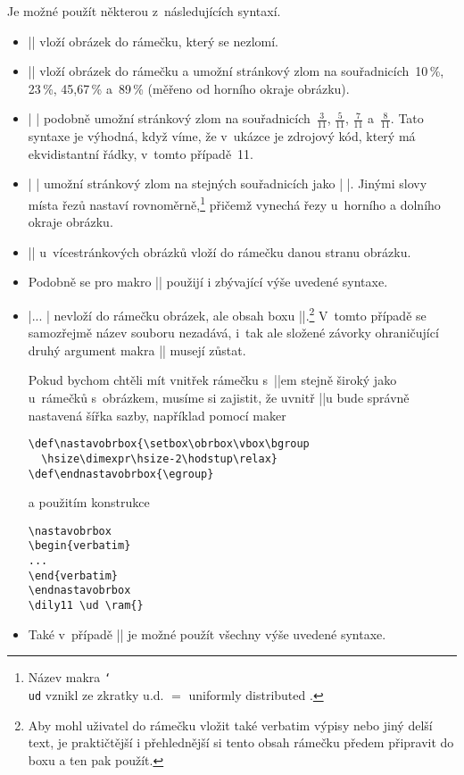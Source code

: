 \documentclass{csbulletin}
\def\p#1{\texttt{\char`\\#1}}
\def\uv#1{\char18 #1\char16 }
\begin{document}
Je možné použít některou z~následujících syntaxí.
\begin{itemize}
\item || vloží obrázek do rámečku, který se nezlomí.
\item || vloží obrázek do rámečku a umožní stránkový zlom na souřadnicích~10\,\%, 23\,\%, 45,67\,\% a~89\,\% (měřeno od horního okraje obrázku).
\item | | podobně umožní stránkový zlom na souřadnicích~$\frac{3}{11}$, $\frac{5}{11}$, $\frac{7}{11}$ a~$\frac{8}{11}$. Tato syntaxe je výhodná, když víme, že v~ukázce je zdrojový kód, který má ekvidistantní řádky, v~tomto případě~11.
\item | \ud {}| umožní stránkový zlom na stejných souřadnicích jako | |. Jinými slovy místa řezů nastaví rovnoměrně,\footnote{Název makra \p{ud} vznikl ze zkratky \uv{u.d.}${}={}$\uv{uniformly distributed}.} přičemž vynechá řezy u~horního a dolního okraje obrázku.
\item || u~vícestránkových obrázků vloží do rámečku danou stranu obrázku.
\item Podobně se pro makro |\Ram| použijí i zbývající výše uvedené syntaxe.
\item |\setbox\obrbox\vbox{...} | nevloží do rámečku obrázek, ale obsah boxu |\obrbox|.\footnote{Aby mohl uživatel do rámečku vložit také verbatim výpisy nebo jiný delší text, je praktičtější i přehlednější si tento obsah rámečku předem připravit do boxu a ten pak použít.} V~tomto případě se samozřejmě název souboru nezadává, i~tak ale složené závorky ohraničující druhý argument makra |\ram| musejí zůstat.

Pokud bychom chtěli mít vnitřek rámečku s~|\obrbox|em stejně široký jako u~rámečků s~obrázkem, musíme si zajistit, že uvnitř |\vbox|u bude správně nastavená šířka sazby, například pomocí maker
\begin{Verbatim}[numbers=none]
\def\nastavobrbox{\setbox\obrbox\vbox\bgroup
  \hsize\dimexpr\hsize-2\hodstup\relax}
\def\endnastavobrbox{\egroup}
\end{Verbatim}
a použitím konstrukce
\begin{Verbatim}[numbers=none]
\nastavobrbox
\begin{verbatim}
...
\end{verbatim}
\endnastavobrbox
\dily11 \ud \ram{}
\end{Verbatim}
\item Také v~případě |\setbox\obrbox| je možné použít všechny výše uvedené syntaxe.
\end{itemize}
\end{document}
